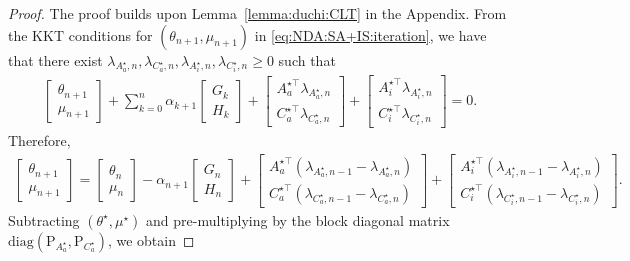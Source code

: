 \documentclass[11pt,a4paper]{article}
\theoremstyle{definition}
\begin{document}
\begin{proof}
The proof builds upon Lemma~\ref{lemma:duchi:CLT} in the Appendix. From the KKT conditions for $(\theta_{n+1},\mu_{n+1})$ in \eqref{eq:NDA:SA+IS:iteration}, we have that there exist $\lambda_{A^\star_a,n}, \lambda_{C^\star_a,n}, \lambda_{A^\star_i,n}, \lambda_{C^\star_i,n} \geq 0$ such that
\begin{align*}
    \begin{bmatrix} \theta_{n+1} \\ \mu_{n+1} \end{bmatrix} + \sum_{k=0}^n \alpha_{k+1} \begin{bmatrix}G_k \\ H_k \end{bmatrix} + \begin{bmatrix} A_a^{\star \top} \lambda_{A^\star_a,n} \\ C_a^{\star\top} \lambda_{C^\star_a,n}\end{bmatrix}  + \begin{bmatrix} A_i^{\star\top} \lambda_{A^\star_i,n} \\ C_i^{\star\top} \lambda_{C^\star_i,n} \end{bmatrix}  = 0.
\end{align*}
Therefore, 
\begin{align*}
    \begin{bmatrix} \theta_{n+1} \\ \mu_{n+1} \end{bmatrix} = \begin{bmatrix} \theta_{n} \\ \mu_{n} \end{bmatrix} - \alpha_{n+1} \begin{bmatrix}G_n \\ H_n \end{bmatrix} + \begin{bmatrix} A_a^{\star\top} (\lambda_{A^\star_a,n-1} - \lambda_{A^\star_a,n}) \\ C_a^{\star\top} (\lambda_{C^\star_a,n-1} - \lambda_{C^\star_a,n})\end{bmatrix}  + \begin{bmatrix} A_i^{\star\top} (\lambda_{A^\star_i,n-1} - \lambda_{A^\star_i,n}) \\ C_i^{\star\top} (\lambda_{C^\star_i,n-1} - \lambda_{C^\star_i,n}) \end{bmatrix}.
\end{align*}
Subtracting $(\theta^\star,\mu^\star)$ and pre-multiplying by the block diagonal matrix $\text{diag}(\text{P}_{A^\star_a},\text{P}_{C^\star_a})$, we obtain

\end{proof}
\end{document}
